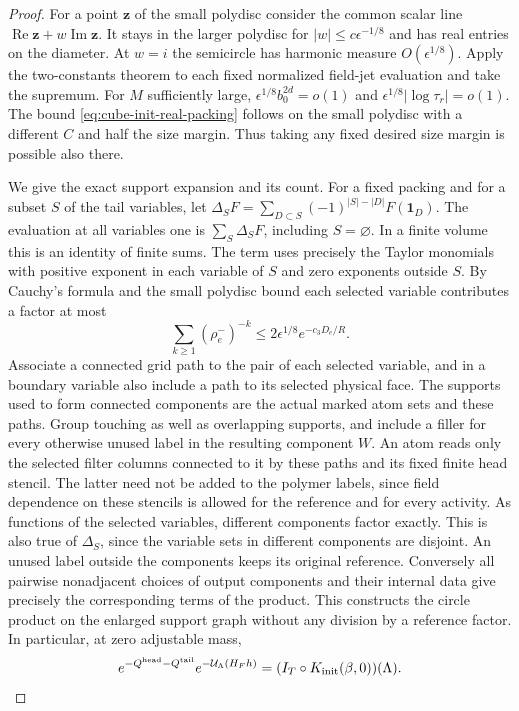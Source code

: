 \documentclass[11pt]{article}
\theoremstyle{definition}
\begin{document}
\begin{proof}
For a point \(\boldsymbol z\) of the small polydisc consider
the common scalar line
\(\operatorname{Re}\boldsymbol z+w\operatorname{Im}\boldsymbol z\).
It stays in the larger polydisc for \(|w|\le c\epsilon^{-1/8}\)
and has real entries on the diameter. At \(w=i\) the semicircle
has harmonic measure \(O(\epsilon^{1/8})\). Apply the two-constants
theorem to each fixed normalized field-jet evaluation and take
the supremum. For \(M\) sufficiently large,
\(\epsilon^{1/8} b_0^{2d}=o(1)\) and
\(\epsilon^{1/8}|\log\tau_r|=o(1)\). The bound
\eqref{eq:cube-init-real-packing} follows on the small polydisc
with a different \(C\) and half the size margin. Thus taking
any fixed desired size margin is possible also there.

We give the exact support expansion and its count. For a fixed
packing and for a subset \(S\) of the tail variables, let
\(\Delta_S F=\sum_{D\subset S}(-1)^{|S|-|D|} F(\boldsymbol1_D)\).
The evaluation at all variables one is \(\sum_S\Delta_S F\),
including \(S=\varnothing\). In a finite volume this is an
identity of finite sums. The term uses precisely the Taylor
monomials with positive exponent in each variable of \(S\)
and zero exponents outside \(S\). By Cauchy's formula and the
small polydisc bound each selected variable contributes a
factor at most
\begin{equation}
 \sum_{k\ge1}(\rho_e^-)^{-k}
 \le 2\epsilon^{1/8}e^{-c_3D_e/R}.
\end{equation}
Associate a connected grid path to the pair of each selected
variable, and in a boundary variable also include a path to
its selected physical face. The supports used to form connected
components are the actual marked atom sets and these paths.
Group touching as well as overlapping supports, and include a
filler for every otherwise unused label in the resulting
component \(W\). An atom reads only the selected filter columns
connected to it by these paths and its fixed finite head stencil.
The latter need not be added to the polymer labels, since field
dependence on these stencils is allowed for the reference and
for every activity. As functions of the selected variables,
different components factor exactly. This is also true of
\(\Delta_S\), since the variable sets in different components
are disjoint. An unused label outside the components keeps its
original reference. Conversely all pairwise nonadjacent choices
of output components and their internal data give precisely the
corresponding terms of the product. This constructs the circle
product on the enlarged support graph without any division
by a reference factor. In particular, at zero adjustable mass,
\begin{equation}
 e^{-Q^{\mathrm{head}}-Q^{\mathrm{tail}}}
 e^{-\mathcal U_\Lambda(H_Fh)}=(I_T\circ K_{\rm init}(\beta,0))(\Lambda).
\end{equation}


\end{proof}
\end{document}

